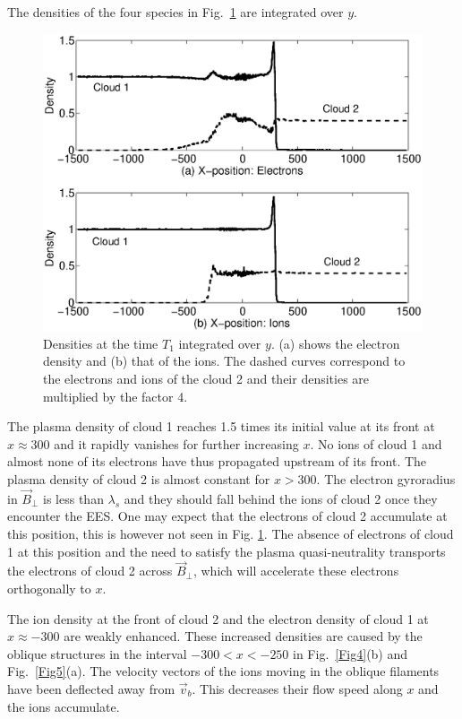 \documentclass[structabstract]{aa}
\begin{document}
The densities of the four species in Fig.~\ref{Fig7} are integrated over $y$.
\begin{figure}
\centering
\includegraphics[width=\columnwidth]{Fig7.eps}
\caption{Densities at the time $T_1$ integrated over $y$. (a) shows the 
electron density and (b) that of the ions. The dashed curves correspond 
to the electrons and ions of the cloud 2 and their densities are multiplied 
by the factor 4.}
\label{Fig7}
\end{figure}
The plasma density of cloud 1 reaches 1.5 times its initial value at its 
front at $x\approx 300$ and it rapidly vanishes for further increasing $x$. 
No ions of cloud 1 and almost none of its electrons have thus propagated 
upstream of its front. The plasma density of cloud 2 is almost constant for 
$x>300$. The electron gyroradius in $\vec{B}_{\perp}$ is less than $\lambda_s$ 
and they should fall behind the ions of cloud 2 once they encounter the EES. 
One may expect that the electrons of cloud 2 accumulate at this position, 
this is however not seen in Fig. \ref{Fig7}. The absence of electrons of 
cloud 1 at this position and the need to satisfy the plasma quasi-neutrality 
transports the electrons of cloud 2 across $\vec{B}_{\perp}$, which will 
accelerate these electrons orthogonally to $x$.

The ion density at the front of cloud 2 and the electron density of cloud
1 at $x\approx -300$ are weakly enhanced. These increased densities are
caused by the oblique structures in the interval $-300 < x < -250$ in 
Fig.~\ref{Fig4}(b) and Fig.~\ref{Fig5}(a). The velocity vectors of the 
ions moving in the oblique filaments have been deflected away from 
$\vec{v}_b$. This decreases their flow speed along $x$ and the ions 
accumulate.
\end{document}
